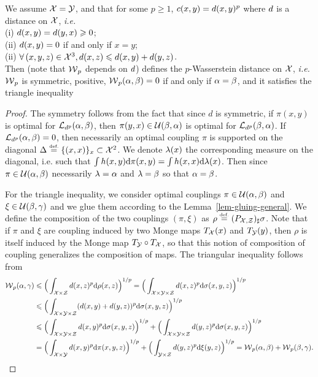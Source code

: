 \begin{prop}\label{prop-metric-measure}
We assume $\mathcal{X}=\mathcal{Y}$, and that for some $p \geq 1$, $c(x,y)=d(x,y)^p$ where $d$ is a distance on $\mathcal{X}$, \emph{i.e.} \\
	\hbox{}\qquad (i) $d(x,y) = d(y,x) \geqslant 0$;  \\
	\hbox{}\qquad (ii)  $d(x,y)=0$ if and only if $x=y$;  \\
	\hbox{}\qquad (ii)  $\forall \, (x,y,z) \in \mathcal{X}^3, d(x,z) \leqslant d(x,y)+d(y,z)$. \\
Then 
(note that $\operatorname{\mathcal{W}}_p$ depends on $d$) defines the $p$-Wasserstein distance on $\mathcal{X}$, \emph{i.e.} $\operatorname{\mathcal{W}}_p$ is symmetric, positive, $\operatorname{\mathcal{W}}_p(\alpha,\beta)=0$ if and only if $\alpha = \beta$, and it satisfies the triangle inequality
\end{prop}

\begin{proof}
	The symmetry follows from the fact that since $d$ is symmetric, if $\pi(x,y)$ is optimal for $\mathcal{L}_{d^p}(\alpha,\beta)$, then 
	$\pi(y,x) \in \mathcal{U}(\beta,\alpha)$ is optimal for $\mathcal{L}_{d^p}(\beta,\alpha)$. 
	If $\mathcal{L}_{d^p}(\alpha,\beta)=0$, then necessarily an optimal coupling $\pi$ is supported on the diagonal $\Delta \stackrel{\mbox{\upshape\tiny def.}}{=} \{(x,x)\}_x \subset \mathcal{X}^2$.
	We denote $\lambda(x)$ the corresponding measure on the diagonal, i.e. such that $\int h(x,y) \mathrm{d}\pi(x,y) = \int h(x,x) \mathrm{d} \lambda(x)$.
	Then since $\pi \in \mathcal{U}(\alpha,\beta)$ necessarily $\lambda=\alpha$ and $\lambda=\beta$ so that $\alpha=\beta$.
	
	For the triangle inequality, we consider optimal couplings $\pi \in \mathcal{U}(\alpha,\beta)$ and $\xi \in \mathcal{U}(\beta,\gamma)$
	and we glue them according to the Lemma~\ref{lem-gluing-general}.
	We define the composition of the two couplings $(\pi,\xi)$ as $\rho \stackrel{\mbox{\upshape\tiny def.}}{=} (P_{\mathcal{X},\mathcal{Z}})_\sharp \sigma$.
	Note that if $\pi$ and $\xi$ are coupling induced by two Monge maps $T_{\mathcal{X}}(x)$ and $T_{\mathcal{Y}}(y)$, then $\rho$ is itself induced by the Monge map $T_{\mathcal{Y}} \circ T_{\mathcal{X}}$, so that this notion of composition of coupling generalizes the composition of maps.
	The triangular inequality follows from  
	$$\begin{aligned}
		\operatorname{\mathcal{W}}_p(\alpha,\gamma) & \leqslant \Big( \int_{\mathcal{X} \times \mathcal{Z}} d(x,z)^p \mathrm{d}\rho(x,z)\Big)^{1/p}  
		= \Big( \int_{\mathcal{X} \times \mathcal{Y} \times \mathcal{Z}} d(x,z)^p \mathrm{d}\sigma(x,y,z)\Big)^{1/p}		\\
		 &\leqslant \Big( \int_{\mathcal{X} \times \mathcal{Y} \times \mathcal{Z}} (d(x,y)+d(y,z))^p \mathrm{d}\sigma(x,y,z)\Big)^{1/p} \\
		 &\leqslant \Big( \int_{\mathcal{X} \times \mathcal{Y} \times \mathcal{Z}} d(x,y)^p \mathrm{d}\sigma(x,y,z)\Big)^{1/p}
		    +  \Big( \int_{\mathcal{X} \times \mathcal{Y} \times \mathcal{Z}} d(y,z)^p \mathrm{d}\sigma(x,y,z)\Big)^{1/p} \\
		  &= \Big( \int_{\mathcal{X} \times \mathcal{Y}} d(x,y)^p \mathrm{d}\pi(x,y,z)\Big)^{1/p}
		    +  \Big( \int_{\mathcal{Y} \times \mathcal{Z}} d(y,z)^p \mathrm{d}\xi(y,z)\Big)^{1/p}
		    = \operatorname{\mathcal{W}}_p(\alpha,\beta)  + \operatorname{\mathcal{W}}_p(\beta,\gamma) .
	\end{aligned}$$
\end{proof}

